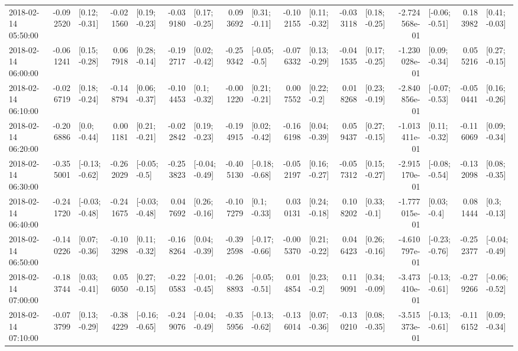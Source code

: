 \begin{tabular}{lrlrlrlrlrlrlrlrl}
2018-02-14 05:50:00 & -0.092520 &   [0.12; -0.31] & -0.021560 &   [0.19; -0.23] & -0.039180 &   [0.17; -0.25] &  0.093692 &   [0.31; -0.11] & -0.102155 &   [0.11; -0.32] & -0.033118 &   [0.18; -0.25] & -2.724568e-01 &  [-0.06; -0.51] &  0.183982 &   [0.41; -0.03] \\
2018-02-14 06:00:00 & -0.061241 &   [0.15; -0.28] &  0.067918 &   [0.28; -0.14] & -0.192717 &   [0.02; -0.42] & -0.259342 &   [-0.05; -0.5] & -0.076332 &   [0.13; -0.29] & -0.041535 &   [0.17; -0.25] & -1.230028e-01 &   [0.09; -0.34] &  0.055216 &   [0.27; -0.15] \\
2018-02-14 06:10:00 & -0.026719 &   [0.18; -0.24] & -0.148794 &   [0.06; -0.37] & -0.104453 &    [0.1; -0.32] & -0.001220 &   [0.21; -0.21] &  0.007552 &    [0.22; -0.2] &  0.018268 &   [0.23; -0.19] & -2.840856e-01 &  [-0.07; -0.53] & -0.050441 &   [0.16; -0.26] \\
2018-02-14 06:20:00 & -0.206886 &    [0.0; -0.44] &  0.001181 &   [0.21; -0.21] & -0.022842 &   [0.19; -0.23] & -0.194915 &   [0.02; -0.42] & -0.166198 &   [0.04; -0.39] &  0.059437 &   [0.27; -0.15] & -1.013411e-01 &   [0.11; -0.32] & -0.116069 &   [0.09; -0.34] \\
2018-02-14 06:30:00 & -0.355001 &  [-0.13; -0.62] & -0.262029 &   [-0.05; -0.5] & -0.253823 &  [-0.04; -0.49] & -0.405130 &  [-0.18; -0.68] & -0.052197 &   [0.16; -0.27] & -0.057312 &   [0.15; -0.27] & -2.915170e-01 &  [-0.08; -0.54] & -0.132098 &   [0.08; -0.35] \\
2018-02-14 06:40:00 & -0.241720 &  [-0.03; -0.48] & -0.241675 &  [-0.03; -0.48] &  0.047692 &   [0.26; -0.16] & -0.107279 &    [0.1; -0.33] &  0.030131 &   [0.24; -0.18] &  0.108202 &    [0.33; -0.1] & -1.777015e-01 &    [0.03; -0.4] &  0.081444 &    [0.3; -0.13] \\
2018-02-14 06:50:00 & -0.140226 &   [0.07; -0.36] & -0.103298 &   [0.11; -0.32] & -0.168264 &   [0.04; -0.39] & -0.392598 &  [-0.17; -0.66] & -0.005370 &   [0.21; -0.22] &  0.046423 &   [0.26; -0.16] & -4.610797e-01 &  [-0.23; -0.76] & -0.252377 &  [-0.04; -0.49] \\
2018-02-14 07:00:00 & -0.183744 &   [0.03; -0.41] &  0.056050 &   [0.27; -0.15] & -0.220583 &  [-0.01; -0.45] & -0.268893 &  [-0.05; -0.51] &  0.014854 &    [0.23; -0.2] &  0.119091 &   [0.34; -0.09] & -3.473410e-01 &  [-0.13; -0.61] & -0.279266 &  [-0.06; -0.52] \\
2018-02-14 07:10:00 & -0.073799 &   [0.13; -0.29] & -0.384229 &  [-0.16; -0.65] & -0.249076 &  [-0.04; -0.49] & -0.355956 &  [-0.13; -0.62] & -0.136014 &   [0.07; -0.36] & -0.130210 &   [0.08; -0.35] & -3.515373e-01 &  [-0.13; -0.61] & -0.116152 &   [0.09; -0.34] \\

\end{tabular}

